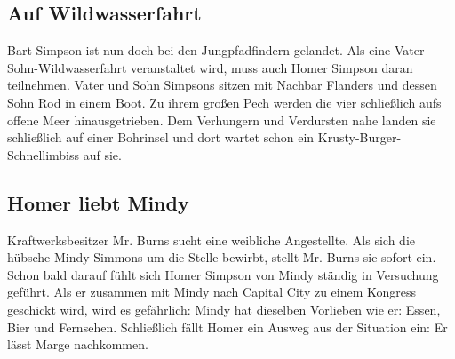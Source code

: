 	
\subsection{Auf Wildwasserfahrt}\label{1F06}
Bart Simpson ist nun doch bei den Jungpfadfindern gelandet. Als eine Vater-Sohn-Wild\-was\-ser\-fahrt veranstaltet wird, muss auch Homer Simpson daran teilnehmen. Vater und Sohn Simpsons sitzen mit Nachbar Flanders und dessen Sohn Rod in einem Boot. Zu ihrem großen Pech werden die vier schließlich aufs offene Meer hinausgetrieben. Dem Verhungern und Verdursten nahe landen sie schließlich auf einer Bohrinsel und dort wartet schon ein Krusty-Burger-Schnellimbiss auf sie.


	
\subsection{Homer liebt Mindy}\label{1F07}
Kraftwerksbesitzer Mr. Burns sucht eine weibliche Angestellte. Als sich die hübsche Mindy Simmons um die Stelle bewirbt, stellt Mr. Burns sie sofort ein. Schon bald darauf fühlt sich Homer Simpson von Mindy ständig in Versuchung geführt. Als er zusammen mit Mindy nach Capital City zu einem Kongress geschickt wird, wird es gefährlich: Mindy hat dieselben Vorlieben wie er: Essen, Bier und Fernsehen. Schließlich fällt Homer ein Ausweg aus der Situation ein: Er lässt Marge nachkommen.


